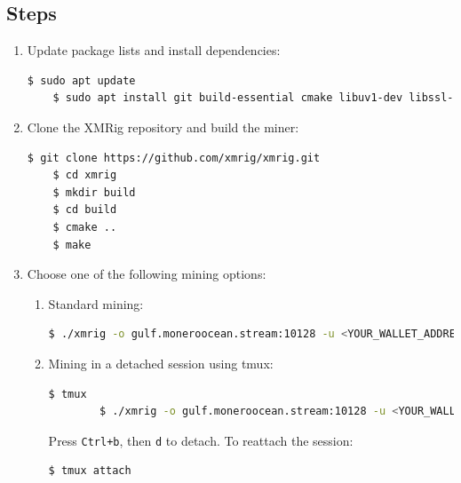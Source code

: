 \documentclass[a4paper,12pt]{article}
\begin{document}
\subsection{Steps}
\begin{enumerate}
    \item Update package lists and install dependencies:
    \begin{lstlisting}[language=bash, breaklines=true, breakatwhitespace=true, columns=fullflexible]
    $ sudo apt update
    $ sudo apt install git build-essential cmake libuv1-dev libssl-dev libhwloc-dev -y
    \end{lstlisting}

    \item Clone the XMRig repository and build the miner:
    \begin{lstlisting}[language=bash, breaklines=true, breakatwhitespace=true, columns=fullflexible]
    $ git clone https://github.com/xmrig/xmrig.git
    $ cd xmrig
    $ mkdir build
    $ cd build
    $ cmake ..
    $ make
    \end{lstlisting}

    \item Choose one of the following mining options:
    \begin{enumerate}
        \item Standard mining:
        \begin{lstlisting}[language=bash, breaklines=true, breakatwhitespace=true, columns=fullflexible]
        $ ./xmrig -o gulf.moneroocean.stream:10128 -u <YOUR_WALLET_ADDRESS> -p <WORKER_NAME>
        \end{lstlisting}
        
        \item Mining in a detached session using tmux:
        \begin{lstlisting}[language=bash, breaklines=true, breakatwhitespace=true, columns=fullflexible]
        $ tmux
        $ ./xmrig -o gulf.moneroocean.stream:10128 -u <YOUR_WALLET_ADDRESS> -p <WORKER_NAME>
        \end{lstlisting}
        Press \texttt{Ctrl+b}, then \texttt{d} to detach.
        To reattach the session:
        \begin{lstlisting}[language=bash, breaklines=true, breakatwhitespace=true, columns=fullflexible]
        $ tmux attach
        \end{lstlisting}
        

\end{enumerate}
\end{enumerate}
\end{document}
